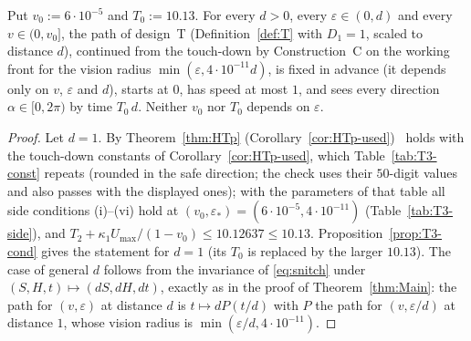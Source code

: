\begin{theorem}\label{thm:Main2}
Put $v_0:=6\cdot10^{-5}$ and $T_0:=10.13$. For every $d>0$, every $\varepsilon\in(0,d)$ and every $v\in(0,v_0]$, the path of
design~T (Definition~\ref{def:T} with $D_1=1$, scaled to distance $d$), continued from the touch-down by Construction~C on the
working front for the vision radius $\min(\varepsilon,4\cdot10^{-11}d)$, is fixed in advance (it depends only on $v$, $\varepsilon$
and $d$), starts at $0$, has speed at most $1$, and sees every direction $\alpha\in[0,2\pi)$ by time $T_0\,d$. Neither $v_0$ nor
$T_0$ depends on $\varepsilon$.
\end{theorem}
\begin{proof}
Let $d=1$. By Theorem~\ref{thm:HTp} (Corollary~\ref{cor:HTp-used}) \TzHT\ holds with the touch-down constants of
Corollary~\ref{cor:HTp-used}, which Table~\ref{tab:T3-const} repeats (rounded in the safe direction; the check uses their
$50$-digit values and also passes with the displayed ones); with the parameters of that table all side conditions (i)--(vi) hold
at $(v_0,\varepsilon_*)=(6\cdot10^{-5},4\cdot10^{-11})$ (Table~\ref{tab:T3-side}), and $T_2+\kappa_1U_{\max}/(1-v_0)\le10.12637\le10.13$. Proposition~\ref{prop:T3-cond}
gives the statement for $d=1$ (its $T_0$ is replaced by the larger $10.13$). The case of general $d$ follows from the invariance
of \eqref{eq:snitch} under $(S,H,t)\mapsto(dS,dH,dt)$, exactly as in the proof of Theorem~\ref{thm:Main}: the path for $(v,\varepsilon)$
at distance $d$ is $t\mapsto dP(t/d)$ with $P$ the path for $(v,\varepsilon/d)$ at distance $1$, whose vision radius is
$\min(\varepsilon/d,4\cdot10^{-11})$.
\end{proof}


